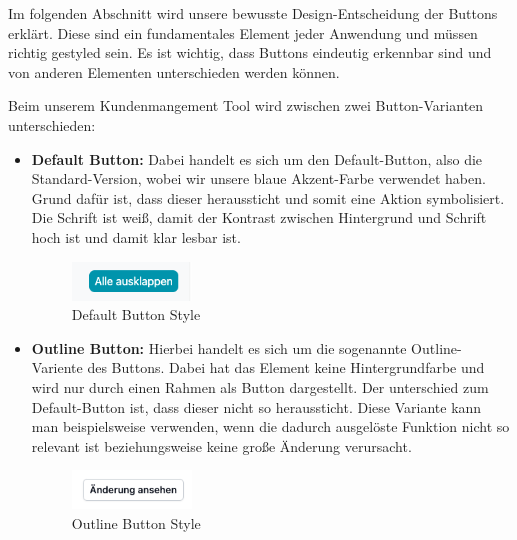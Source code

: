 Im folgenden Abschnitt wird unsere bewusste Design-Entscheidung der Buttons erklärt. Diese sind ein fundamentales Element jeder Anwendung und müssen richtig gestyled sein. Es ist wichtig, dass Buttons eindeutig erkennbar sind und von anderen Elementen unterschieden werden können.

Beim unserem Kundenmangement Tool wird zwischen zwei Button-Varianten unterschieden:

\begin{itemize}
    \item \textbf{Default Button:}
        \newline
        Dabei handelt es sich um den Default-Button, also die Standard-Version, wobei wir unsere blaue Akzent-Farbe verwendet haben. Grund dafür ist, dass dieser heraussticht und somit eine Aktion symbolisiert. Die Schrift ist weiß, damit der Kontrast zwischen Hintergrund und Schrift hoch ist und damit klar lesbar ist.
        \begin{figure}[h!]
            \centering
            \includegraphics[width=0.3\textwidth]{pics/button-default.png}
            \caption{Default Button Style}
            \label{fig:mesh1}
        \end{figure}
\newpage
    \item \textbf{Outline Button:}
        \newline
        Hierbei handelt es sich um die sogenannte Outline-Variente des Buttons. Dabei hat das Element keine Hintergrundfarbe und wird nur durch einen Rahmen als Button dargestellt. Der unterschied zum Default-Button ist, dass dieser nicht so heraussticht. Diese Variante kann man beispielsweise verwenden, wenn die dadurch ausgelöste Funktion nicht so relevant ist beziehungsweise keine große Änderung verursacht.
        \begin{figure}[h!]
            \centering
            \includegraphics[width=0.3\textwidth]{pics/button-outline.png}
            \caption{Outline Button Style}
            \label{fig:mesh1}
        \end{figure}
\end{itemize}